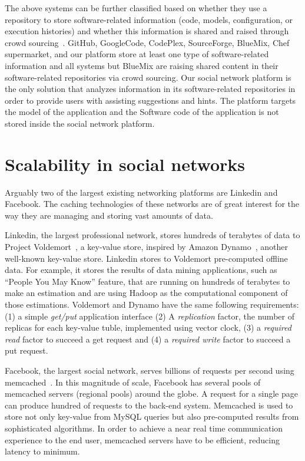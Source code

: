 The above systems can be further classified based on whether they use a repository to store software-related information (code, models, configuration, or execution histories) and whether this information is shared and raised through crowd sourcing~\cite{	howe2006rise}.  GitHub, GoogleCode, CodePlex, SourceForge, BlueMix, Chef supermarket, and our platform store at least one type of software-related information and all systems but BlueMix are raising shared content in their software-related repositories via crowd sourcing. Our social network platform is the only solution that analyzes information in its software-related repositories in order to provide users with assisting suggestions and hints. The platform targets the model of the application and the Software code of the application is not stored inside the social network platform. 

\section{Scalability in social networks}
\label{sec:caching_rel}
Arguably two of the largest existing networking platforms are Linkedin and Facebook. The caching technologies of these networks are of great interest for the way they are managing and storing vast amounts of data.

Linkedin, the largest professional network, stores hundreds of terabytes of data to Project Voldemort~\cite{sumbaly2012serving}, a key-value store, inspired by Amazon Dynamo~\cite{decandia2007dynamo}, another well-known key-value store. Linkedin stores to Voldemort pre-computed offline data. For example, it stores the results of data mining applications, such as ``People You May Know'' feature, that are running on hundreds of terabytes to make an estimation and are using Hadoop as the computational component of those estimations. 
Voldemort and Dynamo have the same following requirements: (1) a simple \emph{get/put} application interface (2) A \emph{replication} factor, the number of replicas for each key-value tuble, implemented using vector clock, (3) a \emph{required read} factor to succeed a get request and (4) a \emph{required write} factor to succeed a put request. 

Facebook, the largest social network, serves billions of requests per second using memcached~\cite{nishtala2013scaling}. In this magnitude of scale, Facebook has several pools of memcached servers (regional pools) around the globe. A request for a single page can produce hundred of requests to the back-end system. Memcached is used to store not only key-value from MySQL queries but also pre-computed results from sophisticated algorithms. 
In order to achieve a near real time communication experience to the end user, memcached servers have to be efficient, reducing latency to minimum. 

